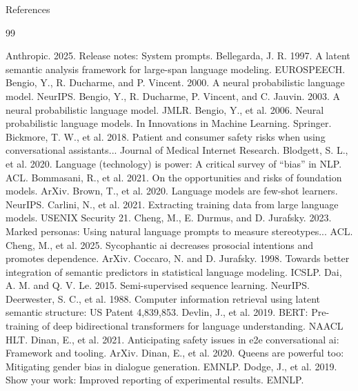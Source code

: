 \documentclass[aspectratio=169]{beamer}
\begin{document}
\begin{frame}[allowframebreaks]{References}\justifying
    \begin{thebibliography}{99}
    \scriptsize
    
     Anthropic. 2025. Release notes: System prompts.
     Bellegarda, J. R. 1997. A latent semantic analysis framework for large-span language modeling. EUROSPEECH.
     Bengio, Y., R. Ducharme, and P. Vincent. 2000. A neural probabilistic language model. NeurIPS.
     Bengio, Y., R. Ducharme, P. Vincent, and C. Jauvin. 2003. A neural probabilistic language model. JMLR.
     Bengio, Y., et al. 2006. Neural probabilistic language models. In Innovations in Machine Learning. Springer.
     Bickmore, T. W., et al. 2018. Patient and consumer safety risks when using conversational assistants... Journal of Medical Internet Research.
     Blodgett, S. L., et al. 2020. Language (technology) is power: A critical survey of “bias” in NLP. ACL.
     Bommasani, R., et al. 2021. On the opportunities and risks of foundation models. ArXiv.
     Brown, T., et al. 2020. Language models are few-shot learners. NeurIPS.
     Carlini, N., et al. 2021. Extracting training data from large language models. USENIX Security 21.
     Cheng, M., E. Durmus, and D. Jurafsky. 2023. Marked personas: Using natural language prompts to measure stereotypes... ACL.
     Cheng, M., et al. 2025. Sycophantic ai decreases prosocial intentions and promotes dependence. ArXiv.
     Coccaro, N. and D. Jurafsky. 1998. Towards better integration of semantic predictors in statistical language modeling. ICSLP.
     Dai, A. M. and Q. V. Le. 2015. Semi-supervised sequence learning. NeurIPS.
     Deerwester, S. C., et al. 1988. Computer information retrieval using latent semantic structure: US Patent 4,839,853.
     Devlin, J., et al. 2019. BERT: Pre-training of deep bidirectional transformers for language understanding. NAACL HLT.
     Dinan, E., et al. 2021. Anticipating safety issues in e2e conversational ai: Framework and tooling. ArXiv.
     Dinan, E., et al. 2020. Queens are powerful too: Mitigating gender bias in dialogue generation. EMNLP.
     Dodge, J., et al. 2019. Show your work: Improved reporting of experimental results. EMNLP.

\end{thebibliography}
\end{frame}
\end{document}
